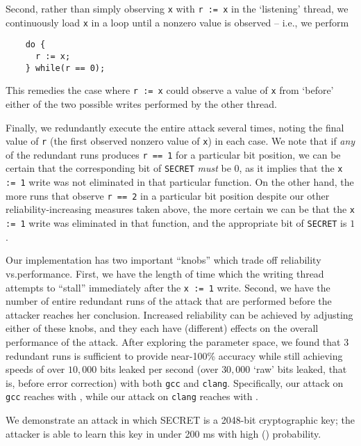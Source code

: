 Second, rather than simply observing \verb|x| with \verb|r := x| in the
`listening' thread, we continuously load \verb|x| in a loop until a
nonzero value is observed -- i.e., we perform
\begin{verbatim}
    do {
      r := x;
    } while(r == 0);
\end{verbatim}
This remedies the case where \verb|r := x| could observe a value of \verb|x|
from `before' either of the two possible writes performed by the other thread.

Finally, we redundantly execute the entire attack several times, noting the
final value of \verb|r| (the first observed nonzero value of \verb|x|) in each
case.
We note that if \emph{any} of the redundant runs produces \verb|r == 1| for a
particular bit position, we can be certain that the corresponding bit of
\verb|SECRET| \emph{must} be $0$, as it implies that the \verb|x := 1| write
was not eliminated in that particular function.
On the other hand, the more runs that observe \verb|r == 2| in a particular bit
position despite our other reliability-increasing measures taken above, the
more certain we can be that the \verb|x := 1| write was eliminated in that
function, and the appropriate bit of \verb|SECRET| is $1$.

Our implementation has two important ``knobs'' which trade off reliability
vs.\@ performance.
First, we have the length of time which the writing thread attempts to
``stall'' immediately after the \verb|x := 1| write.
Second, we have the number of entire redundant runs of the attack that are
performed before the attacker reaches her conclusion.
Increased reliability can be achieved by adjusting either of these knobs,
and they each have (different) effects on the overall performance of the
attack.
After exploring the parameter space, we found that $3$ redundant runs is
sufficient to provide near-100\% accuracy while still achieving speeds of
over $10,000$ bits leaked per second (over $30,000$ `raw' bits leaked, that
is, before error correction) with both \verb|gcc| and \verb|clang|.
Specifically, our attack on \verb|gcc| reaches  with
, while our attack on \verb|clang| reaches
 with .

We demonstrate an attack in which SECRET is a 2048-bit cryptographic key; the
attacker is able to learn this key in under 200 ms with high ()
probability.
